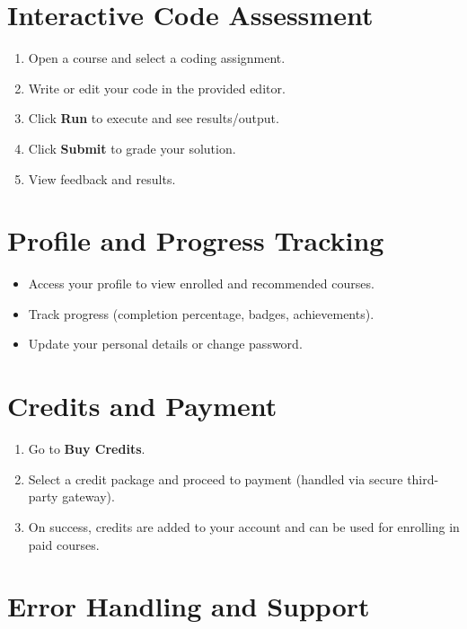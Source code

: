 \documentclass[a4paper,11pt]{scrartcl}
\begin{document}
\section{Interactive Code Assessment}

\begin{enumerate}[leftmargin=*]
    \item Open a course and select a coding assignment.
    \item Write or edit your code in the provided editor.
    \item Click \textbf{Run} to execute and see results/output.
    \item Click \textbf{Submit} to grade your solution.
    \item View feedback and results.
\end{enumerate}

\section{Profile and Progress Tracking}

\begin{itemize}[leftmargin=*]
    \item Access your profile to view enrolled and recommended courses.
    \item Track progress (completion percentage, badges, achievements).
    \item Update your personal details or change password.
\end{itemize}

\section{Credits and Payment}

\begin{enumerate}[leftmargin=*]
    \item Go to \textbf{Buy Credits}.
    \item Select a credit package and proceed to payment (handled via secure third-party gateway).
    \item On success, credits are added to your account and can be used for enrolling in paid courses.
\end{enumerate}

\section{Error Handling and Support}
\end{document}
